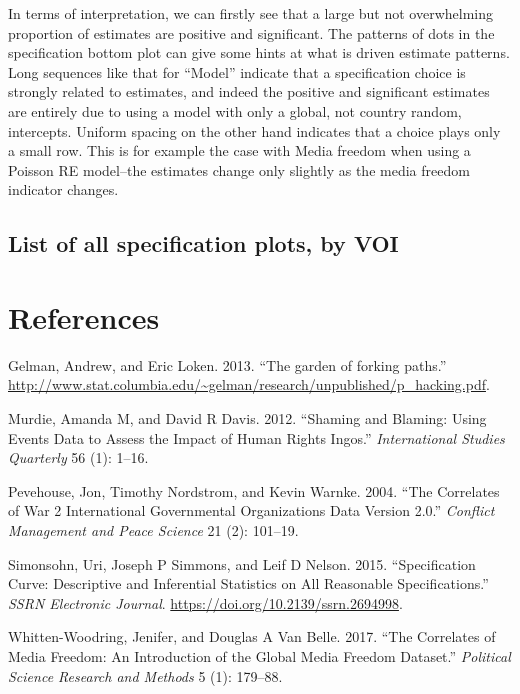 \documentclass[]{article}
\begin{document}
In terms of interpretation, we can firstly see that a large but not
overwhelming proportion of estimates are positive and significant. The
patterns of dots in the specification bottom plot can give some hints at
what is driven estimate patterns. Long sequences like that for ``Model''
indicate that a specification choice is strongly related to estimates,
and indeed the positive and significant estimates are entirely due to
using a model with only a global, not country random, intercepts.
Uniform spacing on the other hand indicates that a choice plays only a
small row. This is for example the case with Media freedom when using a
Poisson RE model--the estimates change only slightly as the media
freedom indicator changes.

\hypertarget{list-of-all-specification-plots-by-voi}{%
\subsection{List of all specification plots, by
VOI}\label{list-of-all-specification-plots-by-voi}}

\hypertarget{references}{%
\section*{References}\label{references}}

\hypertarget{refs}{}
\leavevmode\hypertarget{ref-gelman2013garden}{}%
Gelman, Andrew, and Eric Loken. 2013. ``The garden of forking paths.''
\url{http://www.stat.columbia.edu/~gelman/research/unpublished/p_hacking.pdf}.

\leavevmode\hypertarget{ref-murdie2012shaming}{}%
Murdie, Amanda M, and David R Davis. 2012. ``Shaming and Blaming: Using
Events Data to Assess the Impact of Human Rights Ingos.''
\emph{International Studies Quarterly} 56 (1): 1--16.

\leavevmode\hypertarget{ref-pevehouse2004correlates}{}%
Pevehouse, Jon, Timothy Nordstrom, and Kevin Warnke. 2004. ``The
Correlates of War 2 International Governmental Organizations Data
Version 2.0.'' \emph{Conflict Management and Peace Science} 21 (2):
101--19.

\leavevmode\hypertarget{ref-simonsohn2015specification}{}%
Simonsohn, Uri, Joseph P Simmons, and Leif D Nelson. 2015.
``Specification Curve: Descriptive and Inferential Statistics on All
Reasonable Specifications.'' \emph{SSRN Electronic Journal}.
\url{https://doi.org/10.2139/ssrn.2694998}.

\leavevmode\hypertarget{ref-whitten2017correlates}{}%
Whitten-Woodring, Jenifer, and Douglas A Van Belle. 2017. ``The
Correlates of Media Freedom: An Introduction of the Global Media Freedom
Dataset.'' \emph{Political Science Research and Methods} 5 (1): 179--88.
\end{document}
